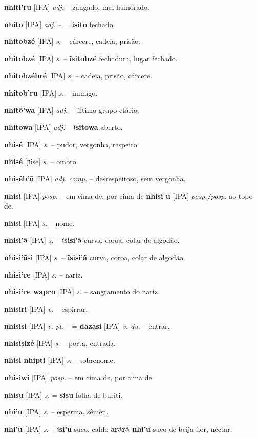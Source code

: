 \textbf{nhiti'ru} [IPA] \textit{adj.} -- zangado, mal-humorado.

\textbf{nhito} [IPA] \textit{adj.} -- = \textbf{ĩsito} fechado.

\textbf{nhitobzé} [IPA] \textit{s.} -- cárcere, cadeia, prisão.

\textbf{nhitobzé} [IPA] \textit{s.} -- \textbf{ĩsitobzé} fechadura, lugar fechado.

\textbf{nhitobzébré} [IPA] \textit{s.} -- cadeia, prisão, cárcere.

\textbf{nhitob'ru} [IPA] \textit{s.} -- inimigo.

\textbf{nhitõ'wa} [IPA] \textit{adj.} -- último grupo etário.

\textbf{nhitowa} [IPA] \textit{adj.} -- \textbf{ĩsitowa} aberto.

\textbf{nhisé} [IPA] \textit{s.} -- pudor, vergonha, respeito.

\textbf{nhisé} [ɲise] \textit{s.} -- ombro.

\textbf{nhiséb'õ} [IPA] \textit{adj. comp.} -- desrespeitoso, sem vergonha.

\textbf{nhisi} [IPA] \textit{posp.} -- em cima de, por cima de  \textbf{nhisi u} [IPA] \textit{posp./posp.} ao topo de.

\textbf{nhisi} [IPA] \textit{s.} -- nome.

\textbf{nhisi'ã} [IPA] \textit{s.} -- \textbf{ĩsisi'ã} curva, coroa, colar de algodão.

\textbf{nhisi'ãsi} [IPA] \textit{s.} -- \textbf{ĩsisi'ã} curva, coroa, colar de algodão.

\textbf{nhisi're} [IPA] \textit{s.} -- nariz.

\textbf{nhisi're wapru} [IPA] \textit{s.} -- sangramento do nariz.

\textbf{nhisiri} [IPA] \textit{v.} -- espirrar.

\textbf{nhisisi} [IPA] \textit{v. pl.} -- = \textbf{dazasi} [IPA] \textit{v. du.} -- entrar.

\textbf{nhisisizé} [IPA] \textit{s.} -- porta, entrada.

\textbf{nhisi nhipti} [IPA] \textit{s.} -- sobrenome.

\textbf{nhisiwi} [IPA] \textit{posp.} -- em cima de, por cima de.

\textbf{nhisu} [IPA] \textit{s.} = \textbf{sisu} folha de buriti.

\textbf{nhi'u} [IPA] \textit{s.} -- esperma, sêmen.

\textbf{nhi'u} [IPA] \textit{s.} -- \textbf{ĩsi'u} suco, caldo  \textbf{arãrã nhi'u} suco de beija-flor, néctar.

